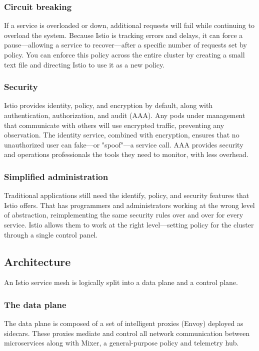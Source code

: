 \documentclass[conference]{IEEEtran}
\begin{document}
\subsubsection{Circuit breaking}
If a service is overloaded or down, additional requests will fail while continuing to overload the system. Because Istio is tracking errors and delays, it can force a pause—allowing a service to recover—after a specific number of requests set by policy. You can enforce this policy across the entire cluster by creating a small text file and directing Istio to use it as a new policy.\cite{IBM}

\subsubsection{Security}
Istio provides identity, policy, and encryption by default, along with authentication, authorization, and audit (AAA). Any pods under management that communicate with others will use encrypted traffic, preventing any observation. The identity service, combined with encryption, ensures that no unauthorized user can fake—or "spoof"—a service call. AAA provides security and operations professionals the tools they need to monitor, with less overhead.\cite{IBM}

\subsubsection{Simplified administration}
Traditional applications still need the identify, policy, and security features that Istio offers. That has programmers and administrators working at the wrong level of abstraction, reimplementing the same security rules over and over for every service. Istio allows them to work at the right level—setting policy for the cluster through a single control panel.\cite{IBM}

\subsection{Architecture}
An Istio service mesh is logically split into a data plane and a control plane.\cite{IBM}
\subsubsection{The data plane}
The data plane is composed of a set of intelligent proxies (Envoy) deployed as sidecars. These proxies mediate and control all network communication between microservices along with Mixer, a general-purpose policy and telemetry hub.\cite{Concepts}
\end{document}
